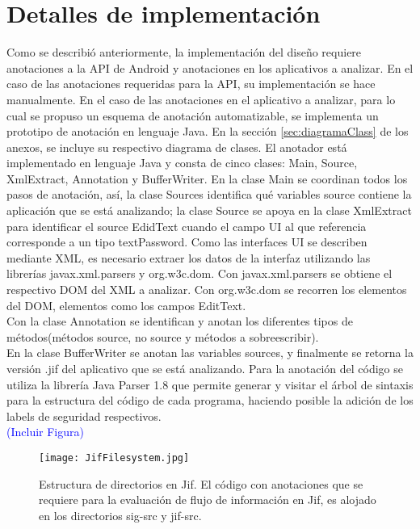 \section{Detalles de implementación}
Como se describió anteriormente, la implementación del diseño requiere
anotaciones a la API de Android y anotaciones en los aplicativos a
analizar.\newline 
En el caso de las anotaciones requeridas para la API, su
implementación se hace manualmente.\newline
En el caso de las anotaciones en el aplicativo a analizar, para lo
cual se propuso un esquema de anotación automatizable, se implementa un
prototipo de anotación en lenguaje Java. En la sección \ref{sec:diagramaClass}
de los anexos, se incluye su respectivo diagrama de clases.\newline
El anotador está implementado en lenguaje Java y consta de cinco clases: Main,
Source, XmlExtract, Annotation y BufferWriter. 
En la clase Main se coordinan todos los pasos de anotación, así, la clase
Sources  identifica qué variables source contiene la aplicación que se está
analizando; la clase Source  se apoya en la clase XmlExtract  para
identificar el source EdidText cuando el campo UI al que referencia corresponde
a un tipo textPassword. Como las interfaces UI se describen mediante XML, es
necesario extraer los datos de la interfaz utilizando las librerías
javax.xml.parsers y org.w3c.dom. Con javax.xml.parsers se obtiene el respectivo
DOM del XML a analizar. Con org.w3c.dom se recorren los elementos del DOM,
elementos como los campos EditText.\\
Con la clase Annotation  se identifican y anotan los diferentes tipos de
métodos(métodos source, no source y métodos a sobreescribir).\\
En la clase BufferWriter  se anotan las variables sources, y finalmente se
retorna la versión .jif del aplicativo que se está analizando.\newline 
Para la anotación del código se utiliza la librería Java Parser 1.8  que permite
generar y visitar el árbol de sintaxis para la estructura del código de cada
programa, haciendo posible la adición de los labels de seguridad respectivos.\\
\textcolor{blue}{(Incluir Figura)}\newline 
\label{subsec:anotador}
\begin{figure}[t!]
	\begin{center}
	\texttt{[image: JifFilesystem.jpg]}
	\end{center}
	\caption{Estructura de directorios en Jif.
	El código con anotaciones que se requiere para la evaluación de flujo de
	información en Jif, es alojado en los directorios sig-src y jif-src.}
	\label{fig:jifFilesystem} 
\end{figure}

